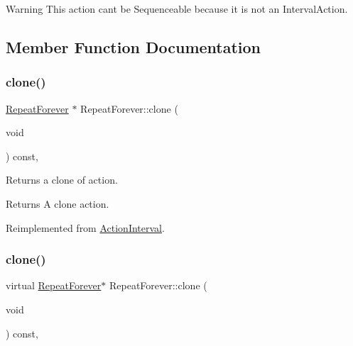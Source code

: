 \begin{DoxyWarning}{Warning}
This action can\textquotesingle{}t be Sequenceable because it is not an Interval\+Action. 
\end{DoxyWarning}


\subsection{Member Function Documentation}
\mbox{\label{classRepeatForever_a6aff66deb28868b17fff43abebff2643}} 
\subsubsection{\texorpdfstring{clone()}{clone()}\hspace{0.1cm}{\footnotesize\ttfamily [1/2]}}
{\footnotesize\ttfamily \hyperlink{classRepeatForever}{Repeat\+Forever} $\ast$ Repeat\+Forever\+::clone (\begin{DoxyParamCaption}\item[{void}]{ }\end{DoxyParamCaption}) const\hspace{0.3cm}{\ttfamily [override]}, {\ttfamily [virtual]}}

Returns a clone of action.

\begin{DoxyReturn}{Returns}
A clone action. 
\end{DoxyReturn}


Reimplemented from \hyperlink{classActionInterval_abc93ce0c2f54a90eb216a7803f25f44a}{Action\+Interval}.

\mbox{\label{classRepeatForever_a91c17cd4313202cb80baa6c115474493}} 
\subsubsection{\texorpdfstring{clone()}{clone()}\hspace{0.1cm}{\footnotesize\ttfamily [2/2]}}
{\footnotesize\ttfamily virtual \hyperlink{classRepeatForever}{Repeat\+Forever}$\ast$ Repeat\+Forever\+::clone (\begin{DoxyParamCaption}\item[{void}]{ }\end{DoxyParamCaption}) const\hspace{0.3cm}{\ttfamily [override]}, {\ttfamily [virtual]}}

